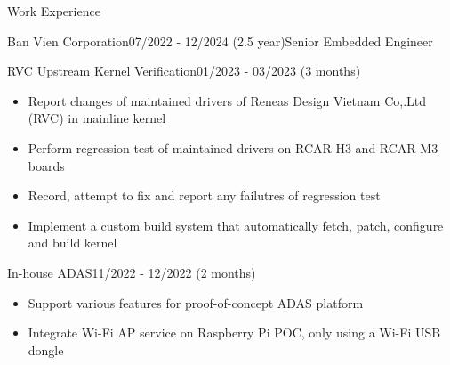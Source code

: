 \documentclass{resume} %
\begin{document}
\begin{rSection}{Work Experience}
\begin{rCompanySubsection}{Ban Vien Corporation}{07/2022 - 12/2024 (2.5 year)}{Senior Embedded Engineer}{}
{        %
        \begin{rProjectSubsubsectionV2}{RVC Upstream Kernel Verification}{01/2023 - 03/2023 (3 months)} {
            \begin{itemize}
                \item Report changes of maintained drivers of Reneas Design Vietnam Co,.Ltd (RVC) in mainline kernel
                \item Perform regression test of maintained drivers on RCAR-H3 and RCAR-M3 boards
                \item Record, attempt to fix and report any failutres of regression test
            \end{itemize}
        }{
            \begin{itemize}
                \item Implement a custom build system that automatically fetch, patch, configure and build kernel
            \end{itemize}
        }
        \end{rProjectSubsubsectionV2}

        \begin{rProjectSubsubsectionV2}{In-house ADAS}{11/2022 - 12/2022 (2 months)} {
            \begin{itemize}
                \item Support various features for proof-of-concept ADAS platform
            \end{itemize}
        }{
            \begin{itemize}
                \item Integrate Wi-Fi AP service on Raspberry Pi POC, only using a Wi-Fi USB dongle
            \end{itemize}
        }
        \end{rProjectSubsubsectionV2}

}
\end{rCompanySubsection}
\end{rSection}
\end{document}
